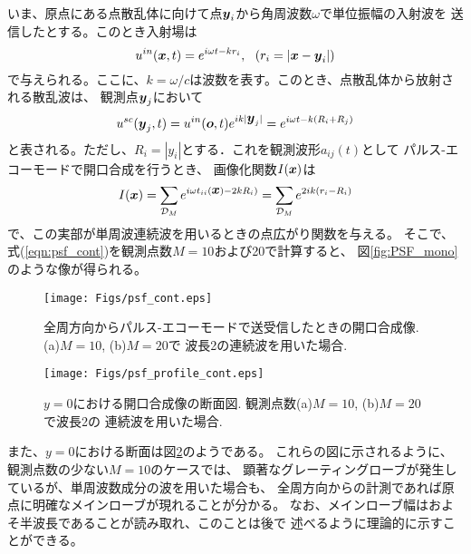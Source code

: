 \documentclass[10pt,a4j,dvipdfmx]{jarticle}
\begin{document}
いま、原点にある点散乱体に向けて点$\mbox{\boldmath $y$}_i$から角周波数$\omega$で単位振幅の入射波を
送信したとする。このとき入射場は
\begin{equation}
	u^{in}(\fat{x},t)=e^{i\omega t-kr_i}, \ \ (r_i=\left| \fat{x}-\fat{y}_i\right|)
	\label{eqn:}
\end{equation}
で与えられる。ここに、$k=\omega/c$は波数を表す。このとき、点散乱体から放射される散乱波は、
観測点$\mbox{\boldmath $y$}_j$において
\begin{equation}
	u^{sc}(\mbox{\boldmath $y$}_j,t)=
	u^{in}(\mbox{\boldmath $o$},t)e^{i k|\mbox{\boldmath $y$}_j|}
	=e^{i\omega t -k(R_i+R_j)}
	\label{eqn:}
\end{equation}
と表される。ただし、$R_i=\left| y_i\right|$とする．これを観測波形$a_{ij}(t)$として
パルス-エコーモードで開口合成を行うとき、
画像化関数$I(\mbox{\boldmath $x$})$は
\begin{equation}
	I(\mbox{\boldmath $x$}) =
	\sum_{{\cal D}_M} 
		e^{i\omega t_{ii}(\mbox{\boldmath $x$}) -2kR_i)}
	=
	\sum_{{\cal D}_M} 
		e^{2ik(r_i-R_i)}
	\label{eqn:PSF_mono}
\end{equation}
で、この実部が単周波連続波を用いるときの点広がり関数を与える。
そこで、式(\ref{eqn:psf_cont})を観測点数$M=10$および20で計算すると、
図\ref{fig:PSF_mono}のような像が得られる。
\begin{figure}[h]
	\begin{center}
	\texttt{[image: Figs/psf\_cont.eps]} 
	\end{center}
	\caption{全周方向からパルス-エコーモードで送受信したときの開口合成像.(a)$M=10$, (b)$M=20$で
	波長2の連続波を用いた場合.} 
	\label{fig:psf_cont}
\end{figure}
\begin{figure}[h]
	\begin{center}
	\texttt{[image: Figs/psf\_profile\_cont.eps]} 
	\end{center}
	\caption{$y=0$における開口合成像の断面図. 観測点数(a)$M=10$, (b)$M=20$で波長2の
	連続波を用いた場合.}
	\label{fig:psf_profile_cont}
\end{figure}
また、$y=0$における断面は図\ref{fig:psf_profile_cont}のようである。
これらの図に示されるように、観測点数の少ない$M=10$のケースでは、
顕著なグレーティングローブが発生しているが、単周波数成分の波を用いた場合も、
全周方向からの計測であれば原点に明確なメインローブが現れることが分かる。
なお、メインローブ幅はおよそ半波長であることが読み取れ、このことは後で
述べるように理論的に示すことができる。
\end{document}

